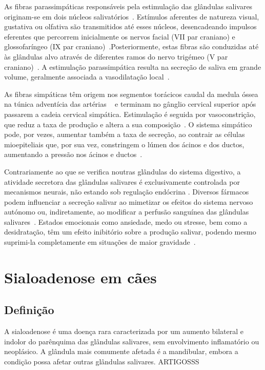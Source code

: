 As fibras parassimpáticas responsáveis pela estimulação das glândulas salivares originam-se em dois núcleos salivatórios~\cite{Poirier2018,Bae2024}. Estímulos aferentes de natureza visual, gustativa ou olfativa são transmitidos até esses núcleos, desencadeando impulsos eferentes que percorrem inicialmente os nervos facial (VII par craniano) e glossofaríngeo (IX par craniano)~\cite{Singh2017}.Posteriormente, estas fibras são conduzidas até às glândulas alvo através de diferentes ramos do nervo trigémeo (V par craniano)~\cite{Singh2017}. A estimulação parassimpática resulta na secreção de saliva em grande volume, geralmente associada a vasodilatação local~\cite{Singh2017}. 


As fibras simpáticas têm origem nos segmentos torácicos caudal da medula óssea na túnica adventícia das artérias ~\cite{Poirier2018,Bae2024} e terminam no gânglio cervical superior após passarem a cadeia cervical simpática. Estimulação é seguida por vasoconstrição, que reduz a taxa de produção e altera a sua composição~\cite{Poirier2018,Singh2017,Bae2024}. O sistema simpático pode, por vezes, aumentar também a taxa de secreção, ao contrair as células mioepiteliais que, por sua vez, constringem o lúmen dos ácinos e dos ductos, aumentando a pressão nos ácinos e ductos~\cite{lobprise_oral_2019}. 


Contrariamente ao que se verifica noutras glândulas do sistema digestivo, a atividade secretora das glândulas salivares é exclusivamente controlada por mecanismos neurais, não estando sob regulação endócrina \cite{cunningham}. Diversos fármacos podem influenciar a secreção salivar ao mimetizar os efeitos do sistema nervoso autónomo ou, indiretamente, ao modificar a perfusão sanguínea das glândulas salivares~\cite{Cattai2016}. Estados emocionais como ansiedade, medo ou stresse, bem como a desidratação, têm um efeito inibitório sobre a produção salivar, podendo mesmo suprimi-la completamente em situações de maior gravidade~\cite{Poirier2018,Bae2024,Singh2017}. 


\section{Sialoadenose em cães}

\subsection{Definição}

A sialoadenose é uma doença rara caracterizada por um aumento bilateral e indolor do parênquima das glândulas salivares, sem envolvimento inflamatório ou neoplásico. A glândula mais comumente afetada é a mandibular, embora a condição possa afetar outras glândulas salivares. ARTIGOSSS

